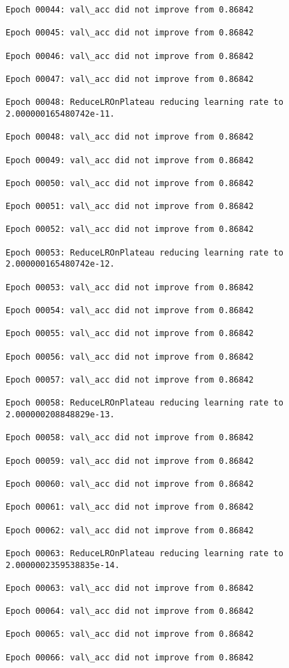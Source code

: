 \documentclass[11pt]{article}
\begin{document}
\begin{Verbatim}[commandchars=\\\{\}]
Epoch 00044: val\_acc did not improve from 0.86842

Epoch 00045: val\_acc did not improve from 0.86842

Epoch 00046: val\_acc did not improve from 0.86842

Epoch 00047: val\_acc did not improve from 0.86842

Epoch 00048: ReduceLROnPlateau reducing learning rate to 2.000000165480742e-11.

Epoch 00048: val\_acc did not improve from 0.86842

Epoch 00049: val\_acc did not improve from 0.86842

Epoch 00050: val\_acc did not improve from 0.86842

Epoch 00051: val\_acc did not improve from 0.86842

Epoch 00052: val\_acc did not improve from 0.86842

Epoch 00053: ReduceLROnPlateau reducing learning rate to 2.000000165480742e-12.

Epoch 00053: val\_acc did not improve from 0.86842

Epoch 00054: val\_acc did not improve from 0.86842

Epoch 00055: val\_acc did not improve from 0.86842

Epoch 00056: val\_acc did not improve from 0.86842

Epoch 00057: val\_acc did not improve from 0.86842

Epoch 00058: ReduceLROnPlateau reducing learning rate to 2.000000208848829e-13.

Epoch 00058: val\_acc did not improve from 0.86842

Epoch 00059: val\_acc did not improve from 0.86842

Epoch 00060: val\_acc did not improve from 0.86842

Epoch 00061: val\_acc did not improve from 0.86842

Epoch 00062: val\_acc did not improve from 0.86842

Epoch 00063: ReduceLROnPlateau reducing learning rate to 2.0000002359538835e-14.

Epoch 00063: val\_acc did not improve from 0.86842

Epoch 00064: val\_acc did not improve from 0.86842

Epoch 00065: val\_acc did not improve from 0.86842

Epoch 00066: val\_acc did not improve from 0.86842


\end{Verbatim}
\end{document}
